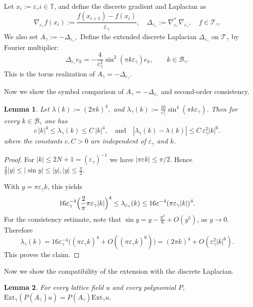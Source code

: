 \documentclass{article}
\newtheorem{lemma}{Lemma}
\begin{document}
Let \(x_i:=\varepsilon_\gamma i \in \mathbb T \), and define the discrete gradient and Laplacian as
\[
\nabla_{\varepsilon_\gamma} f(x_i)
:=
\frac{f(x_{i+1})-f(x_i)}{\varepsilon_\gamma},
\quad
\Delta_{\varepsilon_\gamma}:=\nabla_{\varepsilon_\gamma}^*\nabla_{\varepsilon_\gamma}, \quad f \in \mathcal T_\gamma.
\]
We also set
\(
A_\gamma:=-\Delta_{\varepsilon_\gamma},
\)
Define the extended discrete Laplacian \(\Delta_{\varepsilon_\gamma}\) on \(\mathcal T_\gamma\) by Fourier multiplier:
\[
 \Delta_{\varepsilon_\gamma} e_k =  - \frac{4}{\varepsilon_\gamma^2}\sin^2(\pi k\varepsilon_\gamma)e_k,
\qquad k\in \mathcal{B}_\gamma.
\]
This is the torus realization of \(A_\gamma=-\Delta_{\varepsilon_\gamma}\).

Now we show the symbol comparison of \(A_\gamma=-\Delta_{\varepsilon_\gamma}\) and second-order consistency.

\begin{lemma}\label{lem:symbol_bilaplacian}
Let
\(
\lambda(k):=(2\pi k)^4,
\)
and \(\lambda_\gamma(k):=\frac{16}{\varepsilon_\gamma^4}\sin^4(\pi k\varepsilon_\gamma)\).
Then for every $k \in \mathcal{B}_{\gamma}$ one has
\[
c\,|k|^4\le \lambda_\gamma(k)\le C\,|k|^4, \quad \text{and} \quad |\lambda_\gamma(k)-\lambda(k)|
\le
C\,\varepsilon_{\gamma}^2 |k|^6.
\]
where the constants $c,C>0$ are independent of $\varepsilon_{\gamma}$ and $k$.
\end{lemma}

\begin{proof}
For $|k|\le 2N+1 =(\varepsilon_{\gamma})^{-1}$ we have
$|\pi\varepsilon k|\le \pi/2$. Hence
\(
\frac{2}{\pi}|y|\le |\sin y|\le |y|, |y|\le \frac{\pi}{2}.
\)

With $y=\pi\varepsilon_{\gamma} k$, this yields
\[
16\varepsilon_{\gamma}^{-4}\Bigl(\frac{2}{\pi}\pi\varepsilon_{\gamma} |k|\Bigr)^4
\le
\lambda_{\varepsilon_{\gamma}}(k)
\le
16\varepsilon^{-4}(\pi \varepsilon_{\gamma} |k|)^4.
\]
For the consistency estimate, note that
\( \sin y=y-\frac{y^3}{6}+O(y^5)\), as \( y\to 0\).
Therefore
\[
\lambda_\gamma(k)
=
16\varepsilon_{\gamma}^{-4}\bigl((\pi\varepsilon_{\gamma} k)^4+O((\pi\varepsilon_{\gamma} k)^6)\bigr)
=
(2\pi k)^4 + O(\varepsilon_{\gamma}^2 |k|^6).
\]
This proves the claim.
\end{proof}


Now we show the compatibility of the extension with the discrete Laplacian.

\begin{lemma}
\label{lem:fourier-extension-operator}
For every lattice field \(u\) and every polynomial \(P\),
\(
 \mathrm{Ext}_\gamma(P(A_\gamma)u)=P( A_\gamma) \mathrm{Ext}_\gamma u.
\)
\end{lemma}
\end{document}
